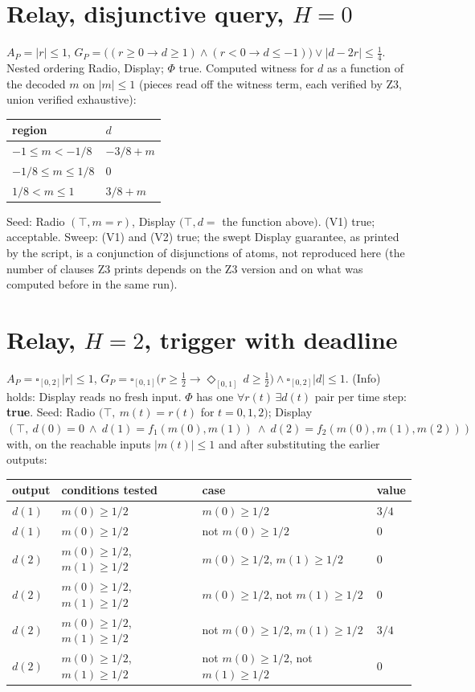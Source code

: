 \documentclass[10pt]{article}\usepackage[margin=0.7in]{geometry}\usepackage{amsmath,amssymb,booktabs,array}
\begin{document}
\section{Relay, disjunctive query, $H=0$}
$A_P=|r|\le1$, $G_P=\big((r\ge0\to d\ge1)\wedge(r<0\to d\le-1)\big)\vee|d-2r|\le\tfrac14$. Nested ordering Radio, Display; $\Phi$ true. Computed witness for $d$ as a function of the decoded $m$ on $|m|\le1$ (pieces read off the witness term, each verified by Z3, union verified exhaustive):
\begin{center}\begin{tabular}{@{}ll@{}}\toprule region & $d$ \\\midrule
$-1\le m<-1/8$ & $-3/8 + m$ \\
$-1/8\le m\le 1/8$ & $0$ \\
$1/8<m\le 1$ & $3/8 + m$ \\
\bottomrule\end{tabular}\end{center}
Seed: Radio $(\top,m=r)$, Display $(\top,d=$ the function above$)$. (V1) true; acceptable. Sweep: (V1) and (V2) true; the swept Display guarantee, as printed by the script, is a conjunction of disjunctions of atoms, not reproduced here (the number of clauses Z3 prints depends on the Z3 version and on what was computed before in the same run).
\section{Relay, $H=2$, trigger with deadline}
$A_P=\square_{[0,2]}|r|\le1$, $G_P=\square_{[0,1]}\big(r\ge\tfrac12\to\Diamond_{[0,1]}\,d\ge\tfrac12\big)\wedge\square_{[0,2]}|d|\le1$. (Info) holds: Display reads no fresh input. $\Phi$ has one $\forall r(t)\,\exists d(t)$ pair per time step: \textbf{true}. Seed: Radio $(\top,\ m(t)=r(t)$ for $t=0,1,2)$; Display $(\top,\ d(0)=0\ \wedge\ d(1)=f_1(m(0),m(1))\ \wedge\ d(2)=f_2(m(0),m(1),m(2)))$ with, on the reachable inputs $|m(t)|\le1$ and after substituting the earlier outputs:
\begin{center}\begin{tabular}{@{}llll@{}}\toprule output & conditions tested & case & value \\\midrule
$d(1)$ & $m(0) \ge  1/2$ & $m(0) \ge  1/2$ & $3/4$ \\
$d(1)$ & $m(0) \ge  1/2$ & not $m(0) \ge  1/2$ & $0$ \\
$d(2)$ & $m(0) \ge  1/2$, $m(1) \ge  1/2$ & $m(0) \ge  1/2$, $m(1) \ge  1/2$ & $0$ \\
$d(2)$ & $m(0) \ge  1/2$, $m(1) \ge  1/2$ & $m(0) \ge  1/2$, not $m(1) \ge  1/2$ & $0$ \\
$d(2)$ & $m(0) \ge  1/2$, $m(1) \ge  1/2$ & not $m(0) \ge  1/2$, $m(1) \ge  1/2$ & $3/4$ \\
$d(2)$ & $m(0) \ge  1/2$, $m(1) \ge  1/2$ & not $m(0) \ge  1/2$, not $m(1) \ge  1/2$ & $0$ \\
\bottomrule\end{tabular}\end{center}
\end{document}

